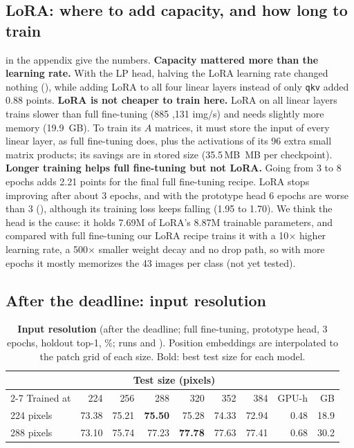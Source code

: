 \subsection{LoRA: where to add capacity, and how long to train}
\label{sec:ablation-lora}

 in the appendix give the numbers.
\textbf{Capacity mattered more than the learning rate.}
With the LP head, halving the LoRA learning rate changed nothing (), while adding LoRA to all four linear layers instead of only \texttt{qkv} added 0.88 points.
\textbf{LoRA is not cheaper to train here.}
LoRA on all linear layers trains slower than full fine-tuning (885 ,131 img/s) and needs slightly more memory (19.9 \,GB).
To train its $A$ matrices, it must store the input of every linear layer, as full fine-tuning does, plus the activations of its 96 extra small matrix products; its savings are in stored size (35.5\,MB \,MB per checkpoint).
\textbf{Longer training helps full fine-tuning but not LoRA.}
Going from 3 to 8 epochs adds 2.21 points for the final full fine-tuning recipe.
LoRA stops improving after about 3 epochs, and with the prototype head 6 epochs are worse than 3 (), although its training loss keeps falling (1.95 to 1.70).
We think the head is the cause: it holds 7.69M of LoRA's 8.87M trainable parameters, and compared with full fine-tuning our LoRA recipe trains it with a 10$\times$ higher learning rate, a 500$\times$ smaller weight decay and no drop path, so with more epochs it mostly memorizes the 43 images per class (not yet tested).

\subsection{After the deadline: input resolution}
\label{sec:post}

\begin{table}[t]
  \caption{\textbf{Input resolution} (after the deadline; full fine-tuning, prototype head, 3 epochs, holdout top-1, \%; runs  and ). Position embeddings are interpolated to the patch grid of each size. Bold: best test size for each model.}
  \label{tab:res}
  \centering
  \footnotesize
  \setlength{\tabcolsep}{6pt}
  \begin{tabular}{@{}lrrrrrrrr@{}}
    \toprule
    & \multicolumn{6}{c}{Test size (pixels)} & & \\
    \cmidrule(lr){2-7}
    Trained at & 224 & 256 & 288 & 320 & 352 & 384 & GPU-h & GB \\
    \midrule
    224 pixels & 73.38 & 75.21 & \textbf{75.50} & 75.28 & 74.33 & 72.94 & 0.48 & 18.9 \\
    288 pixels & 73.10 & 75.74 & 77.23 & \textbf{77.78} & 77.63 & 77.41 & 0.68 & 30.2 \\
    \bottomrule
  \end{tabular}
\end{table}


